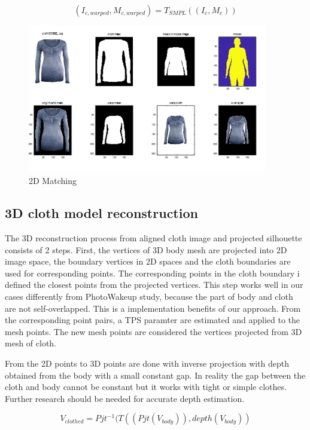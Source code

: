 \documentclass[runningheads]{llncs}
\begin{document}
\begin{equation}
(I_{c, warped}, M_{c, warped})  = T_{SMPL} ((I_c, M_c))
\end{equation}


\begin{figure}
\centering
\includegraphics[height=6.5cm, scale=0.7]{figures/2dmatching.png}   %
\caption{2D Matching}
\label{fig:2DmatchingOfClothAndBody}
\end{figure}


\subsection{3D cloth model reconstruction }


The 3D reconstruction process from aligned cloth image and projected silhouette consists of 2 steps. First, the vertices of 3D body mesh are projected into 2D image space, the boundary  vertices in 2D spaces and the cloth boundaries are used for corresponding points. The corresponding points in the cloth boundary i defined the closest points from the projected vertices.  This step works well in our cases differently from PhotoWakeup study, because the part of body and cloth are not self-overlapped. This is a implementation benefits of our approach. From the corresponding point pairs, a TPS paramter are estimated and applied to the mesh points. The new mesh points are considered the vertices projected from 3D mesh of cloth.    

From the 2D points to 3D points are done with inverse projection with depth obtained from the body with a small constant gap. In reality the gap between the cloth and body cannot be constant but it works with tight or simple clothes. Further research should be needed for accurate depth estimation.   

\begin{equation}
V_{clothed} = Pjt^{-1} ( T( (Pjt(V_{body})), depth(V_{body}) )
\end{equation}
\end{document}
